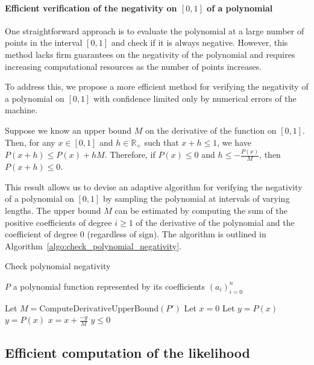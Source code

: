 \paragraph*{Efficient verification of the negativity on $[0,1]$ of a polynomial} One straightforward approach is to evaluate the polynomial at a large number of points in the interval \([0,1]\) and check if it is always negative. However, this method lacks firm guarantees on the negativity of the polynomial and requires increasing computational resources as the number of points increases.

To address this, we propose a more efficient method for verifying the negativity of a polynomial on \([0,1]\) with confidence limited only by numerical errors of the machine.

Suppose we know an upper bound \(M\) on the derivative of the function on \([0,1]\). Then, for any \(x \in [0,1]\) and \(h \in \mathbb{R}_+\) such that \(x+h\leq 1\), we have \(P(x+h) \leq P(x) + hM\). Therefore, if \(P(x) \leq 0\) and \(h \leq -\frac{P(x)}{M}\), then \(P(x+h) \leq 0\).

This result allows us to devise an adaptive algorithm for verifying the negativity of a polynomial on \([0,1]\) by sampling the polynomial at intervals of varying lengths. The upper bound \(M\) can be estimated by computing the sum of the positive coefficients of degree \(i \geq 1\) of the derivative of the polynomial and the coefficient of degree \(0\) (regardless of sign). The algorithm is outlined in Algorithm~\ref{algo:check_polynomial_negativity}.

\begin{algorithm}[H]
    \caption{Check polynomial negativity}
    \begin{algorithmic}[1]
    \Require $P$ a polynomial function represented by its coefficients $(a_i)_{i=0}^n$ 
        
    \State Let $M=\text{ComputeDerivativeUpperBound}(P')$
    \State Let $x=0$
    \State Let $y=P(x)$
        \State $y=P(x)$
        \State $x = x + \frac{-y}{M}$
    \EndWhile
    \State \Return $y\leq 0$
\end{algorithmic}

\label{algo:check_polynomial_negativity}
\end{algorithm}


\subsection{Efficient computation of the likelihood}

